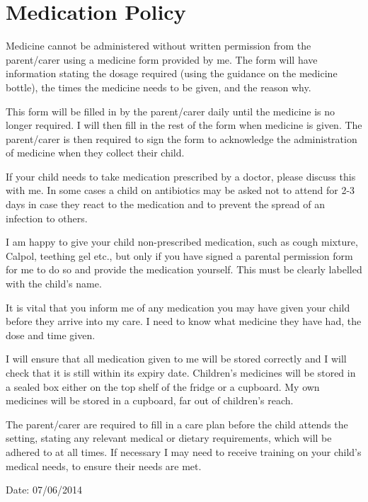 

\section{Medication Policy}

Medicine cannot be administered without written permission from the
parent/carer using a medicine form provided by me. The form will have
information stating the dosage required (using the guidance on the
medicine bottle), the times the medicine needs to be given, and the
reason why.

This form will be filled in by the parent/carer daily until the medicine
is no longer required. I will then fill in the rest of the form when
medicine is given. The parent/carer is then required to sign the form to
acknowledge the administration of medicine when they collect their
child.

If your child needs to take medication prescribed by a doctor, please
discuss this with me. In some cases a child on antibiotics may be asked
not to attend for 2-3 days in case they react to the medication and to
prevent the spread of an infection to others.

I am happy to give your child non-prescribed medication, such as cough
mixture, Calpol, teething gel etc., but only if you have signed a
parental permission form for me to do so and provide the medication
yourself. This must be clearly labelled with the child's name.

It is vital that you inform me of any medication you may have given your
child before they arrive into my care. I need to know what medicine they
have had, the dose and time given.

I will ensure that all medication given to me will be stored correctly
and I will check that it is still within its expiry date. Children's
medicines will be stored in a sealed box either on the top shelf of the
fridge or a cupboard. My own medicines will be stored in a cupboard, far
out of children's reach.

The parent/carer are required to fill in a care plan before the child
attends the setting, stating any relevant medical or dietary
requirements, which will be adhered to at all times. If necessary I may
need to receive training on your child's medical needs, to ensure their
needs are met.

Date: 07/06/2014


